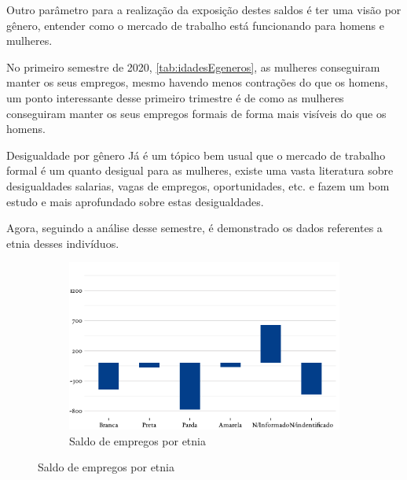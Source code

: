 \par Outro parâmetro para a realização da exposição destes saldos é ter uma visão por gênero, entender como o mercado de trabalho está funcionando para homens e mulheres. 


\par No primeiro semestre de 2020,  \ref{tab:idadesEgeneros}, as mulheres conseguiram manter os seus empregos, mesmo havendo menos contrações do que os homens, um ponto interessante desse primeiro trimestre é de como as mulheres conseguiram manter os seus empregos formais de forma mais visíveis do que os homens.


\begin{smbox}[label={labelbox},nameref={Desigualdade por gênero}]{Desigualdade por gênero}
	Já é um tópico bem usual que o mercado de trabalho formal é um quanto desigual para as mulheres, existe uma vasta literatura sobre desigualdades salarias, vagas de empregos, oportunidades, etc. \cite{bibCotrim2020desigualdade} e \cite{bibHaussmann2018desigualdades} fazem um bom estudo e mais aprofundado sobre estas desigualdades.
\end{smbox}


\par Agora, seguindo a análise desse semestre, é demonstrado os dados referentes a etnia desses indivíduos.

\begin{figure}[!h]
\begin{subfigure}{\linewidth}
	\caption{Saldo de empregos por etnia}
	\label{fig:sel2020}
	\includegraphics{fig/Saldo por etnia.pdf}
\end{subfigure}
\end{figure}


